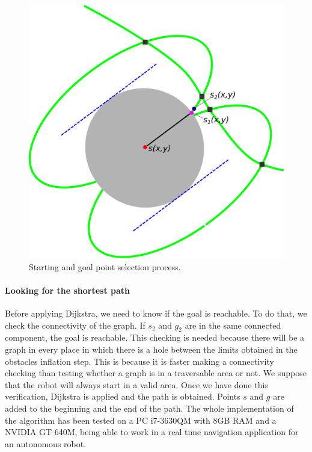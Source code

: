 \begin{figure}[h!]
  \centering
  \includegraphics[width=\textwidth, trim=0 0 0 0,clip]{figure6}
  \caption{Starting and goal point selection process.}
  \label{fig:cp06_findstartgoal}
\end{figure}

\paragraph{Looking for the shortest path}\label{ch:chapter06_01_02_04_02}

Before applying Dijkstra, we need to know if the goal is reachable. To do that, we check the connectivity of the graph. If $s_2$ and $g_2$ are in the same connected component, the goal is reachable. This checking is needed because there will be a graph in every place in which there is a hole between the limits obtained in the obstacles inflation step. This is because it is faster making a connectivity checking than testing whether a graph is in a traversable area or not. We suppose that the robot will always start in a valid area.
Once we have done this verification, Dijkstra is applied and the path is obtained. Points $s$ and $g$ are added to the beginning and the end of the path. The whole implementation of the algorithm has been tested on a PC i7-3630QM with 8GB RAM and a NVIDIA GT 640M, being able to work in a real time navigation application for an autonomous robot.

